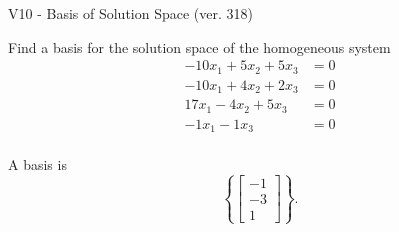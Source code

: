 \begin{exercise}
  \begin{exerciseTitle}V10 - Basis of Solution Space (ver. 318)\end{exerciseTitle}
  \begin{exerciseStatement}
    Find a basis for the solution space of the homogeneous system 
\begin{align*}
 -10 x_ 1 + 5 x_ 2 + 5 x_ 3 &= 0  \\ 
  -10 x_ 1 + 4 x_ 2 + 2 x_ 3 &= 0  \\ 
  17 x_ 1 -4 x_ 2 + 5 x_ 3 &= 0  \\ 
  -1 x_ 1 -1 x_ 3 &= 0  \\ 
 \end{align*}


 
  \end{exerciseStatement}

  \begin{exerciseAnswer}
   A basis is   
\[\left\{\left[\begin{array}{c}
-1 \\
-3 \\
1
\end{array}\right]\right\}.\]

  


  \end{exerciseAnswer}
\end{exercise}